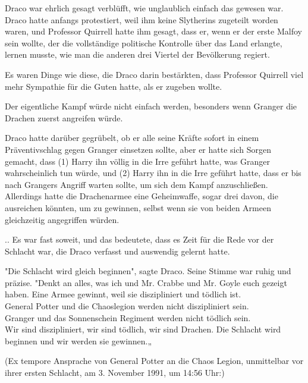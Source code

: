 {Draco war ehrlich gesagt verblüfft, wie unglaublich einfach das gewesen war. Draco hatte anfangs protestiert, weil ihm keine Slytherins zugeteilt worden waren, und Professor Quirrell hatte ihm gesagt, dass er, wenn er der erste Malfoy sein wollte, der die vollständige politische Kontrolle über das Land erlangte, lernen musste, wie man die anderen drei Viertel der Bevölkerung regiert.

Es waren Dinge wie diese, die Draco darin bestärkten, dass Professor Quirrell viel mehr Sympathie für die Guten hatte, als er zugeben wollte.

Der eigentliche Kampf würde nicht einfach werden, besonders wenn Granger die Drachen zuerst angreifen würde.

Draco hatte darüber gegrübelt, ob er alle seine Kräfte sofort in einem Präventivschlag gegen Granger einsetzen sollte, aber er hatte sich Sorgen gemacht, dass (1) Harry ihn völlig in die Irre geführt hatte, was Granger wahrscheinlich tun würde, und (2) Harry ihn in die Irre geführt hatte, dass er bis nach Grangers Angriff warten sollte, um sich dem Kampf anzuschließen.\\ Allerdings hatte die Drachenarmee eine Geheimwaffe, sogar drei davon, die ausreichen könnten, um zu gewinnen, selbst wenn sie von beiden Armeen gleichzeitig angegriffen würden.

.. Es war fast soweit, und das bedeutete, dass es Zeit für die Rede vor der Schlacht war, die Draco verfasst und auswendig gelernt hatte.

"Die Schlacht wird gleich beginnen", sagte Draco. Seine Stimme war ruhig und präzise. "Denkt an alles, was ich und Mr. Crabbe und Mr. Goyle euch gezeigt haben. Eine Armee gewinnt, weil sie diszipliniert und tödlich ist.\\ General Potter und die Chaoslegion werden nicht diszipliniert sein.\\ Granger und das Sonnenschein Regiment werden nicht tödlich sein.\\ Wir sind diszipliniert, wir sind tödlich, wir sind Drachen. Die Schlacht wird beginnen und wir werden sie gewinnen.„

(Ex tempore Ansprache von General Potter an die Chaos Legion, unmittelbar vor ihrer ersten Schlacht, am 3. November 1991, um 14:56 Uhr:)

}
